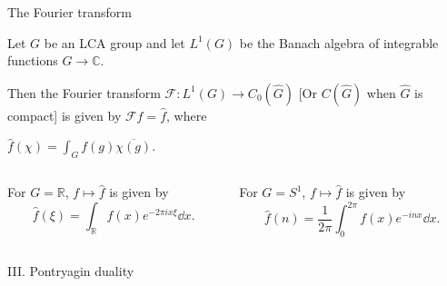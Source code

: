 \documentclass[mathserif
, handout
]{beamer}
\begin{document}
\begin{frame}{The Fourier transform}
    \begin{definition}
        Let $G$ be an LCA group and let $L^1(G)$ be the Banach algebra of integrable functions $G\to \mathbb{C}$. \pause 

        Then the Fourier transform $\mathcal{F} \colon L^1(G)\to C_0(\widehat{\hspace{0pt}G})$ [Or $C(\widehat{\hspace{0pt}G})$ when $\widehat{\hspace{0pt}G}$ is compact] is given by $\mathcal{F}f =\hat{f}$, where \begin{center}
            $\hat{f}(\chi) = \int_G f(g)\overline{\chi(g)}$.
        \end{center}
    \end{definition}
    \pause
    \vspace{1em}
    \begin{columns}
        \begin{column}{0.46\linewidth}
            For $G= \mathbb{R}$, $f\mapsto \hat{f}$ is given by \[\hat{f}(\xi) = \int_{\mathbb{R}}f(x)e^{-2\pi i x\xi}\dd{x}.\]
        \end{column}\pause \begin{column}{0.46\linewidth}
           For $G = S^1$, $f\mapsto\hat{f}$ is given by \[\hat{f}(n) = \frac{1}{2\pi}\int_{0}^{2\pi}f(x)e^{- in x}\dd{x}.\] 
        \end{column}
    \end{columns}
\end{frame}

\begin{frame}{}
    \begin{block}{}{
        \begin{center}\Large III. Pontryagin duality\end{center}}
    \end{block}
\end{frame}
\end{document}
